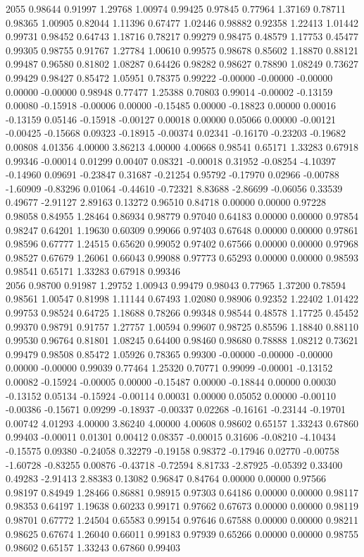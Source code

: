 {2055 0.98644 0.91997 1.29768 1.00974 0.99425 0.97845 0.77964 1.37169 0.78711 0.98365 1.00905 0.82044 1.11396 0.67477 1.02446 0.98882 0.92358 1.22413 1.01442 0.99731 0.98452 0.64743 1.18716 0.78217 0.99279 0.98475 0.48579 1.17753 0.45477 0.99305 0.98755 0.91767 1.27784 1.00610 0.99575 0.98678 0.85602 1.18870 0.88121 0.99487 0.96580 0.81802 1.08287 0.64426 0.98282 0.98627 0.78890 1.08249 0.73627 0.99429 0.98427 0.85472 1.05951 0.78375 0.99222 -0.00000 -0.00000 -0.00000 0.00000 -0.00000 0.98948 0.77477 1.25388 0.70803 0.99014 -0.00002 -0.13159 0.00080 -0.15918 -0.00006 0.00000 -0.15485 0.00000 -0.18823 0.00000 0.00016 -0.13159 0.05146 -0.15918 -0.00127 0.00018 0.00000 0.05066 0.00000 -0.00121 -0.00425 -0.15668 0.09323 -0.18915 -0.00374 0.02341 -0.16170 -0.23203 -0.19682 0.00808 4.01356 4.00000 3.86213 4.00000 4.00668 0.98541 0.65171 1.33283 0.67918 0.99346 -0.00014 0.01299 0.00407 0.08321 -0.00018 0.31952 -0.08254 -4.10397 -0.14960 0.09691 -0.23847 0.31687 -0.21254 0.95792 -0.17970 0.02966 -0.00788 -1.60909 -0.83296 0.01064 -0.44610 -0.72321 8.83688 -2.86699 -0.06056 0.33539 0.49677 -2.91127 2.89163 0.13272 0.96510 0.84718 0.00000 0.00000 0.97228 0.98058 0.84955 1.28464 0.86934 0.98779 0.97040 0.64183 0.00000 0.00000 0.97854 0.98247 0.64201 1.19630 0.60309 0.99066 0.97403 0.67648 0.00000 0.00000 0.97861 0.98596 0.67777 1.24515 0.65620 0.99052 0.97402 0.67566 0.00000 0.00000 0.97968 0.98527 0.67679 1.26061 0.66043 0.99088 0.97773 0.65293 0.00000 0.00000 0.98593 0.98541 0.65171 1.33283 0.67918 0.99346 \\
2056 0.98700 0.91987 1.29752 1.00943 0.99479 0.98043 0.77965 1.37200 0.78594 0.98561 1.00547 0.81998 1.11144 0.67493 1.02080 0.98906 0.92352 1.22402 1.01422 0.99753 0.98524 0.64725 1.18688 0.78266 0.99348 0.98544 0.48578 1.17725 0.45452 0.99370 0.98791 0.91757 1.27757 1.00594 0.99607 0.98725 0.85596 1.18840 0.88110 0.99530 0.96764 0.81801 1.08245 0.64400 0.98460 0.98680 0.78888 1.08212 0.73621 0.99479 0.98508 0.85472 1.05926 0.78365 0.99300 -0.00000 -0.00000 -0.00000 0.00000 -0.00000 0.99039 0.77464 1.25320 0.70771 0.99099 -0.00001 -0.13152 0.00082 -0.15924 -0.00005 0.00000 -0.15487 0.00000 -0.18844 0.00000 0.00030 -0.13152 0.05134 -0.15924 -0.00114 0.00031 0.00000 0.05052 0.00000 -0.00110 -0.00386 -0.15671 0.09299 -0.18937 -0.00337 0.02268 -0.16161 -0.23144 -0.19701 0.00742 4.01293 4.00000 3.86240 4.00000 4.00608 0.98602 0.65157 1.33243 0.67860 0.99403 -0.00011 0.01301 0.00412 0.08357 -0.00015 0.31606 -0.08210 -4.10434 -0.15575 0.09380 -0.24058 0.32279 -0.19158 0.98372 -0.17946 0.02770 -0.00758 -1.60728 -0.83255 0.00876 -0.43718 -0.72594 8.81733 -2.87925 -0.05392 0.33400 0.49283 -2.91413 2.88383 0.13082 0.96847 0.84764 0.00000 0.00000 0.97566 0.98197 0.84949 1.28466 0.86881 0.98915 0.97303 0.64186 0.00000 0.00000 0.98117 0.98353 0.64197 1.19638 0.60233 0.99171 0.97662 0.67673 0.00000 0.00000 0.98119 0.98701 0.67772 1.24504 0.65583 0.99154 0.97646 0.67588 0.00000 0.00000 0.98211 0.98625 0.67674 1.26040 0.66011 0.99183 0.97939 0.65266 0.00000 0.00000 0.98755 0.98602 0.65157 1.33243 0.67860 0.99403 \\
}
